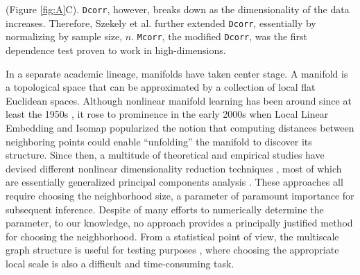 \documentclass[11pt]{article}
\newcommand{\note}[2][]{\added[#1,remark={#2}]{}}
\providecommand{\sct}[1]{{\sc \texttt{#1}}}
\newcommand{\Dcorr}{\sct{Dcorr}}
\newcommand{\Mcorr}{\sct{Mcorr}}
\newcommand{\jovo}[1]{{\note{jv: #1}}}
\newcommand{\cs}[1]{{\note{cs: #1}}}
\begin{document}
(Figure \ref{fig:A}C). 
\Dcorr, however, breaks down as the dimensionality of the data increases.  Therefore, Szekely et al. \cite{SzekelyRizzo2013a} further extended \Dcorr, essentially by normalizing by sample size,  $n$. 
\Mcorr, the modified \Dcorr, was the first dependence test proven to work in high-dimensions.

In a separate academic lineage, manifolds have taken center stage.  A manifold is a topological space that can be approximated by a collection of local flat Euclidean spaces.  Although nonlinear manifold learning has been around since at least the 1950s \cite{TorgersonBook}, it rose to prominence in the early 2000s when Local Linear Embedding \cite{SaulRoweis2000} and Isomap \cite{TenenbaumSilvaLangford2000} popularized the notion that computing distances between neighboring points could enable ``unfolding'' the manifold to discover its structure.  Since then, a multitude of theoretical and empirical studies have devised different nonlinear dimensionality reduction techniques \cite{LeeVerleysen2007}, most of which are essentially generalized principal components analysis \cite{ScholkopfSmolaMuller1999}.  These approaches all require choosing the neighborhood size, a parameter of paramount importance for subsequent inference. Despite of many efforts to numerically determine the parameter, to our knowledge, no approach provides a principally justified method for choosing the neighborhood. From a statistical point of view, the multiscale graph structure is useful for testing purposes \cite{David1966,Friedman1983,Schilling1986,Dumcke2014,HHG2016}, where choosing the appropriate local scale is also a difficult and time-consuming task. \jovo{i don't understand this sentence, ie, why it is here and what it means.} \cs{it means the same thing as the previous sentence, i.e., they do not provide a good way for parameter choosing.}
\end{document}
